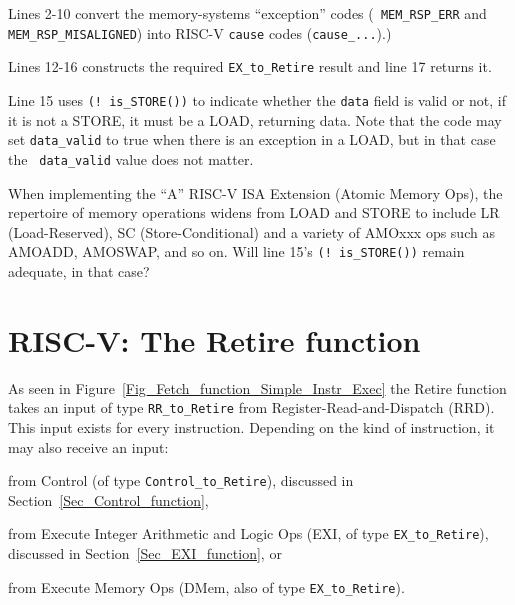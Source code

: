 Lines 2-10 convert the memory-systems ``exception'' codes ({\tt
MEM\_RSP\_ERR} and {\tt MEM\_RSP\_MISALIGNED}) into RISC-V {\tt cause}
codes ({\tt cause\_...}).)

Lines 12-16 constructs the required {\tt EX\_to\_Retire} result and
line 17 returns it.

Line 15 uses {\tt (!~is\_STORE())} to indicate whether the {\tt data}
field is valid or not, {\ie} if it is not a STORE, it must be a LOAD,
returning data.  Note that the code may set {\tt data\_valid} to true
when there is an exception in a LOAD, but in that case the {\tt
data\_valid} value does not matter.

\hdivider

\Exercise

When implementing the ``A'' RISC-V ISA Extension (Atomic Memory Ops),
the repertoire of memory operations widens from LOAD and STORE to
include LR (Load-Reserved), SC (Store-Conditional) and a variety of
AMOxxx ops such as AMOADD, AMOSWAP, and so on.
Will line 15's {\tt (!~is\_STORE())} remain adequate, in that case?

\Endexercise


\section{RISC-V: The Retire function}

\label{Sec_Retire_function}


As seen in Figure~\ref{Fig_Fetch_function_Simple_Instr_Exec} the
Retire function takes an input of type \verb|RR_to_Retire| from
Register-Read-and-Dispatch (RRD).  This input exists for every
instruction.  Depending on the kind of instruction, it may also
receive an input:

\begin{tightlist}

  \item from Control (of type \verb|Control_to_Retire|), discussed in
    Section~\ref{Sec_Control_function},

  \item from Execute Integer Arithmetic and Logic Ops (EXI, of type
    \verb|EX_to_Retire|), discussed in Section~\ref{Sec_EXI_function},
    or

  \item from Execute Memory Ops (DMem, also of type
    \verb|EX_to_Retire|).

\end{tightlist}

